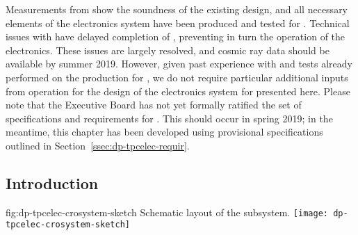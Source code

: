 Measurements from  show the soundness of the existing design, and all necessary elements of the  electronics system have been produced and tested for . Technical issues with  have delayed completion of , preventing in turn the operation of the electronics. These issues are largely resolved, and cosmic ray data should be available by summer 2019. However, given past experience with  and tests already performed on the production for , we do not require particular additional inputs from  operation for the design of the electronics system for  presented here. Please note that the  Executive Board has not yet formally ratified the set of specifications and requirements for . This should occur in spring 2019; in the meantime, this chapter has been developed using provisional specifications outlined in Section~\ref{ssec:dp-tpcelec-requir}.

\begin{comment}  Anne's not sure this is needed.
This chapter is organized as follows. In this section we provide an overview of the \dword{dp} \dword{tpc} electronics system and discuss design considerations. In Section~\ref{sec:dp-tpcelec-design}, we give detailed descriptions of the principal components. This is followed by the discussion of the production scheme, quality assurance and control, and calibration program in Section~\ref{sec:dp-tpcelec-production}. Section~\ref{sec:dp-tpcelec-transport} briefly covers the transportation and handling, while Section~\ref{sec:dp-tpcelec-intfc} describes interfaces to other detector systems. Details on the installation, integration, and commissioning of the \dword{dp} \dword{tpc} electronics system underground are provided in Section~\ref{sec:dp-tpcelec-install}. Sections~\ref{sec:dp-tpcelec-risks} and~\ref{sec:dp-tpcelec-safety} address risks and safety, respectively. Section~\ref{sec:dp-tpcelec-org} presents the organizational structure of the \dword{dp} \dword{tpc} electronics consortium, discusses schedule, and provides the estimates of the core costs. 
\end{comment}

\subsection{Introduction}
\label{ssec:dp-tpcelec-intro}

\begin{dunefigure}{fig:dp-tpcelec-crosystem-sketch}
{Schematic layout of the   subsystem.}
\texttt{[image: dp-tpcelec-crosystem-sketch]}
\end{dunefigure}


